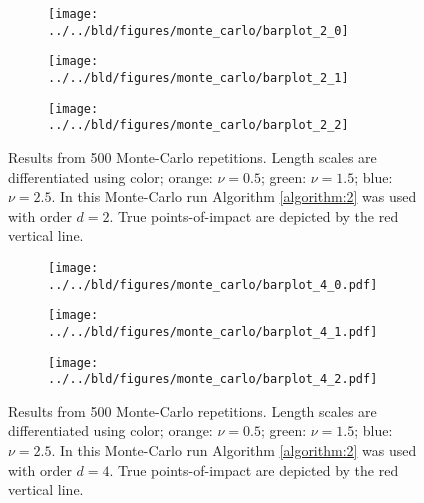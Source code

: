 \begin{figure}

\begin{subfigure}[b]{\textwidth}
\centering
\texttt{[image: ../../bld/figures/monte\_carlo/barplot\_2\_0]}
\end{subfigure}

\begin{subfigure}[b]{\textwidth}
\centering
\texttt{[image: ../../bld/figures/monte\_carlo/barplot\_2\_1]}
\end{subfigure}

\begin{subfigure}[b]{\textwidth}
\centering
\texttt{[image: ../../bld/figures/monte\_carlo/barplot\_2\_2]}
\end{subfigure}

\caption{Results from 500 Monte-Carlo repetitions. Length scales are differentiated
using color; orange: $\nu = 0.5$; green: $\nu = 1.5$; blue: $\nu = 2.5$. In this
Monte-Carlo run Algorithm \ref{algorithm:2} was used with order $d = 2$. True
points-of-impact are depicted by the red vertical line.}
\label{figure:monte_carlo_results_order2}
\end{figure}

\begin{figure}

\begin{subfigure}[b]{\textwidth}
\centering
\texttt{[image: ../../bld/figures/monte\_carlo/barplot\_4\_0.pdf]}
\end{subfigure}

\begin{subfigure}[b]{\textwidth}
\centering
\texttt{[image: ../../bld/figures/monte\_carlo/barplot\_4\_1.pdf]}
\end{subfigure}

\begin{subfigure}[b]{\textwidth}
\centering
\texttt{[image: ../../bld/figures/monte\_carlo/barplot\_4\_2.pdf]}
\end{subfigure}

\caption{Results from 500 Monte-Carlo repetitions. Length scales are differentiated
using color; orange: $\nu = 0.5$; green: $\nu = 1.5$; blue: $\nu = 2.5$. In this
Monte-Carlo run Algorithm \ref{algorithm:2} was used with order $d = 4$. True
points-of-impact are depicted by the red vertical line.}
\label{figure:monte_carlo_results_order4}
\end{figure}
